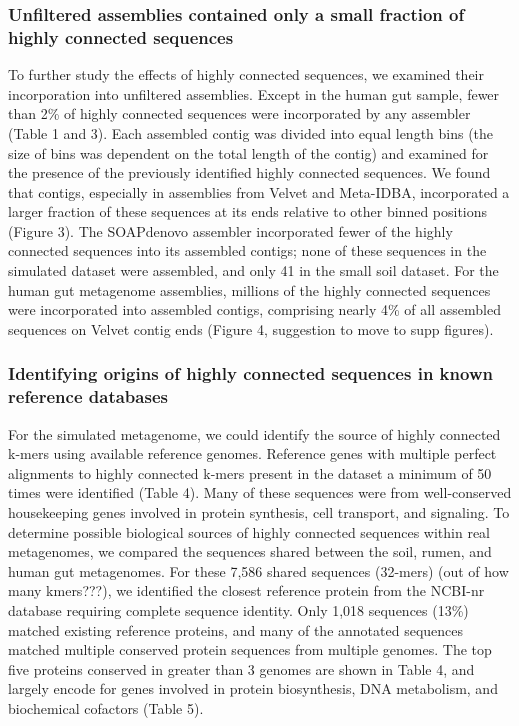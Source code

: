 \documentclass[10pt]{article}
\begin{document}
\subsubsection*{Unfiltered assemblies contained only a small fraction of highly connected sequences}
To further study the effects of highly connected sequences, we
examined their incorporation into unfiltered assemblies.  Except in
the human gut sample, fewer than 2\% of highly connected sequences
were incorporated by any assembler (Table 1 and 3).  Each assembled
contig was divided into equal length bins (the size of bins was
dependent on the total length of the contig) and examined for the
presence of the previously identified highly connected sequences.  We
found that contigs, especially in assemblies from Velvet and
Meta-IDBA, incorporated a larger fraction of these sequences at its
ends relative to other binned positions (Figure 3).  The SOAPdenovo
assembler incorporated fewer of the highly connected sequences into
its assembled contigs; none of these sequences in the simulated
dataset were assembled, and only 41 in the small soil dataset.  For
the human gut metagenome assemblies, millions of the highly connected
sequences were incorporated into assembled contigs, comprising nearly
4\% of all assembled sequences on Velvet contig ends (Figure 4,
suggestion to move to supp figures).

\subsubsection*{Identifying origins of highly connected sequences in known reference databases}

For the simulated metagenome, we could identify the source of highly
connected k-mers using available reference genomes. Reference genes
with multiple perfect alignments to highly connected k-mers present in
the dataset a minimum of 50 times were identified (Table 4).  Many of
these sequences were from well-conserved housekeeping genes involved
in protein synthesis, cell transport, and signaling.  To determine
possible biological sources of highly connected sequences within real
metagenomes, we compared the sequences shared between the soil, rumen,
and human gut metagenomes.  For these 7,586 shared sequences (32-mers)
(out of how many kmers???), we identified the closest reference
protein from the NCBI-nr database requiring complete sequence
identity.  Only 1,018 sequences (13\%) matched existing reference
proteins, and many of the annotated sequences matched multiple
conserved protein sequences from multiple genomes.  The top five
proteins conserved in greater than 3 genomes are shown in Table 4, and
largely encode for genes involved in protein biosynthesis, DNA
metabolism, and biochemical cofactors (Table 5).
\end{document}
